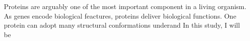 Proteins are arguably one of the most important component in a living organism. As genes encode biological feactures, proteins deliver biological functions. One protein can adopt many structural conformations underand   In this study, I will be 